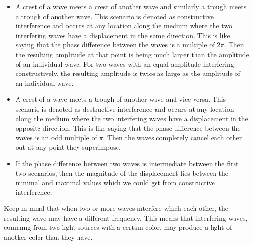 \begin{itemize}
  \item A crest of a wave meets a crest of another wave and similarly a trough meets a trough of another wave. This scenario is denoted as constructive interference and occurs at any location along the medium where the two interfering waves have a displacement in the same direction. This is like saying that the phase difference between the waves is a multiple of $2\pi$. Then the resulting amplitude at that point is being much larger than the amplitude of an individual wave. For two waves with an equal amplitude interfering constructively, the resulting amplitude is twice as large as the amplitude of an individual wave.
  \item A crest of a wave meets a trough of another wave and vice versa. This scenario is denoted as destructive interference and occurs at any location along the medium where the two interfering waves have a displacement in the opposite direction. This is like saying that the phase difference between the waves is an odd multiple of $\pi$. Then the waves completely cancel each other out at any point they superimpose.
  \item If the phase difference between two waves is intermediate between the first two scenarios, then the magnitude of the displacement lies between the minimal and maximal values which we could get from constructive interference.
\end{itemize}

Keep in mind that when two or more waves interfere which each other, the resulting wave may have a different frequency. This means that interfering waves, comming from two light sources with a certain color, may produce a light of another color than they have.

